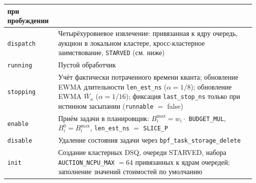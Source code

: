 \documentclass[14pt, oneside]{extbook}
\begin{document}
\begin{center}
\begin{longtable}{|P{3cm}|P{11.5cm}|}
                                при пробуждении \\
                        \hline
                        \texttt{dispatch} & Четырёхуровневое
                                извлечение: привязанная к ядру
                                очередь, аукцион в локальном
                                кластере, кросс-кластерное
                                заимствование, \texttt{STARVED}
                                (см. ниже) \\
                        \hline
                        \texttt{running} & Пустой обработчик \\
                        \hline
                        \texttt{stopping} & Учёт фактически
                                потраченного времени кванта;
                                обновление EWMA длительности
                                \texttt{len\_est\_ns}
                                ($\alpha = 1/8$); обновление
                                EWMA $\bar W_\kappa$
                                ($\alpha = 1/16$); фиксация
                                \texttt{last\_stop\_ns} только
                                при истинном засыпании
                                (\texttt{runnable} $=$ false) \\
                        \hline
                        \texttt{enable} & Приём задачи в
                                планировщик: $B_i^{\max} = w_i
                                \cdot$ \texttt{BUDGET\_MUL},
                                $B_i^0 = B_i^{\max}$,
                                \texttt{len\_est\_ns}
                                $=$ \texttt{SLICE\_P} \\
                        \hline
                        \texttt{disable} & Удаление состояния
                                задачи через
                                \texttt{bpf\_task\_storage\_delete} \\
                        \hline
                        \texttt{init} & Создание кластерных
                                DSQ, очереди STARVED, набора
                                \texttt{AUCTION\_\allowbreak NCPU\_MAX}
                                $= 64$ привязанных к ядрам
                                очередей; заполнение значений
                                стоимостей по умолчанию \\
                        \hline
        \end{longtable}
        \end{center}
\end{document}
